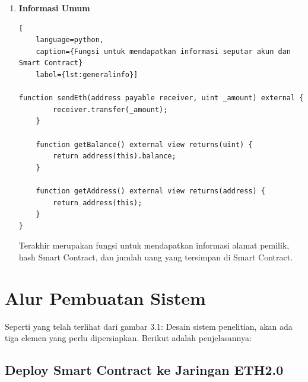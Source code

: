\begin{enumerate}
\begin{lstlisting}[
	language=python,
	caption={Fungsi kirim uang dari Smart Contract ke alamat penerima},
	label={lst:sendEth}]
function sendEth(address payable receiver, uint _amount) external {
        receiver.transfer(_amount);
    }
\end{lstlisting}

Keempat fungsi pengiriman uang ke penerima. Pengiriman ini menggunakan metode transfer dari dokumentasi bahasa pemrograman Solidity. Metode transfer ini digunakan karena bisa melakukan return ketika ada error yang terjadi.

\item{\textbf{Informasi Umum}}
\begin{lstlisting}[
	language=python,
	caption={Fungsi untuk mendapatkan informasi seputar akun dan Smart Contract}
	label={lst:generalinfo}]

function sendEth(address payable receiver, uint _amount) external {
        receiver.transfer(_amount);
    }

    function getBalance() external view returns(uint) {
        return address(this).balance;
    }

    function getAddress() external view returns(address) {
        return address(this);
    }
}

\end{lstlisting}
Terakhir merupakan fungsi untuk mendapatkan informasi alamat pemilik, hash Smart Contract, dan jumlah uang yang tersimpan di Smart Contract.
\end{enumerate}

\section{Alur Pembuatan Sistem}
\label{sec:alurkerja}

Seperti yang telah terlihat dari gambar 3.1: Desain sistem penelitian, akan ada tiga elemen yang perlu dipersiapkan. Berikut adalah penjelasannya:

\subsection{Deploy Smart Contract ke Jaringan ETH2.0}
\label{subsec:how2DeployContract}

